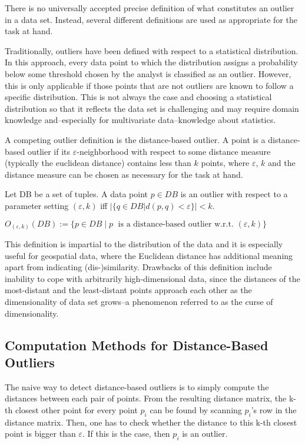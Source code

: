 \documentclass[runningheads]{llncs}
\begin{document}
There is no universally accepted precise definition of what constitutes an outlier in a data set. Instead, several different definitions are used as appropriate for the task at hand.

Traditionally, outliers have been defined with respect to a statistical distribution. In this approach, every data point to which the distribution assigns a probability below some threshold chosen by the analyst is classified as an outlier. However, this is only applicable if those points that are not outliers are known to follow a specific distribution. This is not always the case and choosing a statistical distribution so that it reflects the data set is challenging and may require domain knowledge and--especially for multivariate data--knowledge about statistics.

A competing outlier definition is the distance-based outlier. A point is a distance-based outlier if its $\varepsilon$-neighborhood with respect to some distance measure (typically the euclidean distance) contains less than $k$ points, where $\varepsilon$, $k$ and the distance measure can be chosen as necessary for the task at hand.

\begin{definition}
    Let DB be a set of tuples. A data point $p\in DB$ is an outlier with respect to a parameter setting $(\varepsilon,k)$ iff 
    $|\{q \in DB | d(p,q) < \varepsilon\}| < k$.

    $O_{(\varepsilon,k)}(DB) := \{p\in DB \;| \;p\;\text{ is a distance-based outlier w.r.t. }(\varepsilon,k) \}$
\end{definition}

This definition is impartial to the distribution of the data and it is especially useful for geospatial data, where the Euclidean distance has additional meaning apart from indicating (dis-)similarity. Drawbacks of this definition include inability to cope with arbitrarily high-dimensional data, since the distances of the most-distant and the least-distant points approach each other as the dimensionality of data set grows--a phenomenon referred to as the curse of dimensionality. %
\subsection{Computation Methods for Distance-Based Outliers}

The naive way to detect distance-based outliers is to simply compute the distances between each pair of points. From the resulting distance matrix, the k-th closest other point for every point $p_i$ can be found by scanning $p_i$'s row in the distance matrix. Then, one has to check whether the distance to this k-th closest point is bigger than $\varepsilon$. If this is the case, then $p_i$ is an outlier.
\end{document}
